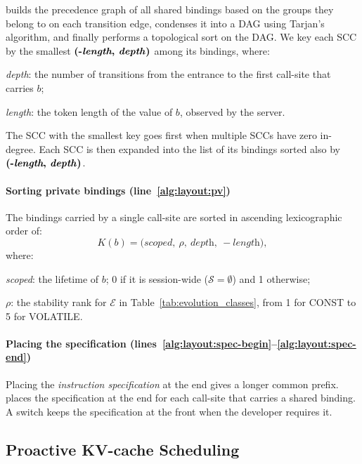 \sysname builds the precedence graph of all shared bindings based on the groups they belong to on each transition edge, condenses it into a DAG using Tarjan's algorithm, and finally performs a topological sort on the DAG. We key each SCC by the smallest $\textbf{(-\textit{length}, \textit{depth})}$ among its bindings, where:
\begin{enumerate*}[label=\textbf{(\roman*)}]
    \item \textit{depth}: the number of transitions from the entrance to the first call-site that carries $b$;
    \item \textit{length}: the token length of the value of $b$, observed by the server.
\end{enumerate*}
The SCC with the smallest key goes first when multiple SCCs have zero in-degree. Each SCC is then expanded into the list of its bindings sorted also by $\textbf{(-\textit{length}, \textit{depth})}$.

\paragraph{Sorting private bindings {\normalfont(line~\ref{alg:layout:pv})}} The bindings carried by a single call-site are sorted in ascending lexicographic order of:
\[
K(b)=\big(\textit{scoped},\ \rho,\ \textit{depth},\ -\textit{length}\big),
\]
where:
\begin{enumerate*}[label=\textbf{(\roman*)}]
    \item \textit{scoped}: the lifetime of $b$; 0 if it is session-wide ($\mathcal{S}=\emptyset$) and 1 otherwise;
    \item $\rho$: the stability rank for $\mathcal{E}$ in Table~\ref{tab:evolution_classes}, from 1 for CONST to 5 for VOLATILE.
\end{enumerate*}


\paragraph{Placing the specification {\normalfont(lines~\ref{alg:layout:spec-begin}--\ref{alg:layout:spec-end})}} 
Placing the \emph{instruction specification} at the end gives a longer common prefix. \sysname places the specification at the end for each call-site that carries a shared binding. A switch keeps the specification at the front when the developer requires it. 



\subsection{Proactive KV-cache Scheduling}
\label{sec:Proactive KV-Cache Scheduling}

